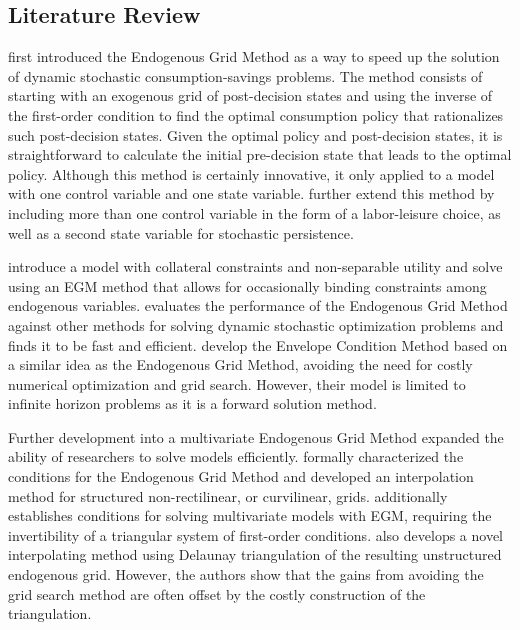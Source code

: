 \documentclass[\econtexRoot/SequentialEGM]{subfiles}
\begin{document}
\subsection{Literature Review} %


\cite{Carroll2006} first introduced the Endogenous Grid Method as a way to speed up the solution of dynamic stochastic consumption-savings problems. The method consists of starting with an exogenous grid of post-decision states and using the inverse of the first-order condition to find the optimal consumption policy that rationalizes such post-decision states. Given the optimal policy and post-decision states, it is straightforward to calculate the initial pre-decision state that leads to the optimal policy. Although this method is certainly innovative, it only applied to a model with one control variable and one state variable. \cite{Barillas2007} further extend this method by including more than one control variable in the form of a labor-leisure choice, as well as a second state variable for stochastic persistence.

\cite{Hintermaier2010} introduce a model with collateral constraints and non-separable utility and solve using an EGM method that allows for occasionally binding constraints among endogenous variables. \cite{Jorgensen2013} evaluates the performance of the Endogenous Grid Method against other methods for solving dynamic stochastic optimization problems and finds it to be fast and efficient. \cite{Maliar2013} develop the Envelope Condition Method based on a similar idea as the Endogenous Grid Method, avoiding the need for costly numerical optimization and grid search. However, their model is limited to infinite horizon problems as it is a forward solution method.

Further development into a multivariate Endogenous Grid Method expanded the ability of researchers to solve models efficiently. \cite{White2015} formally characterized the conditions for the Endogenous Grid Method and developed an interpolation method for structured non-rectilinear, or curvilinear, grids. \cite{Iskhakov2015} additionally establishes conditions for solving multivariate models with EGM, requiring the invertibility of a triangular system of first-order conditions. \cite{Ludwig2018} also develops a novel interpolating method using Delaunay triangulation of the resulting unstructured endogenous grid. However, the authors show that the gains from avoiding the grid search method are often offset by the costly construction of the triangulation.
\end{document}
